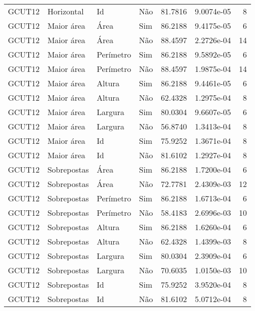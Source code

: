 \begin{tabular}{llllrrr}
GCUT12    & Horizontal  & Id        & Não         & 81.7816      & 9.0074e-05 & 8        \\
GCUT12    & Maior área  & Área      & Sim         & 86.2188      & 9.4175e-05 & 6        \\
GCUT12    & Maior área  & Área      & Não         & 88.4597      & 2.2726e-04 & 14       \\
GCUT12    & Maior área  & Perímetro & Sim         & 86.2188      & 9.5892e-05 & 6        \\
GCUT12    & Maior área  & Perímetro & Não         & 88.4597      & 1.9875e-04 & 14       \\
GCUT12    & Maior área  & Altura    & Sim         & 86.2188      & 9.4461e-05 & 6        \\
GCUT12    & Maior área  & Altura    & Não         & 62.4328      & 1.2975e-04 & 8        \\
GCUT12    & Maior área  & Largura   & Sim         & 80.0304      & 9.6607e-05 & 6        \\
GCUT12    & Maior área  & Largura   & Não         & 56.8740      & 1.3413e-04 & 8        \\
GCUT12    & Maior área  & Id        & Sim         & 75.9252      & 1.3671e-04 & 8        \\
GCUT12    & Maior área  & Id        & Não         & 81.6102      & 1.2927e-04 & 8        \\
GCUT12    & Sobrepostas & Área      & Sim         & 86.2188      & 1.7200e-04 & 6        \\
GCUT12    & Sobrepostas & Área      & Não         & 72.7781      & 2.4309e-03 & 12       \\
GCUT12    & Sobrepostas & Perímetro & Sim         & 86.2188      & 1.6713e-04 & 6        \\
GCUT12    & Sobrepostas & Perímetro & Não         & 58.4183      & 2.6996e-03 & 10       \\
GCUT12    & Sobrepostas & Altura    & Sim         & 86.2188      & 1.6260e-04 & 6        \\
GCUT12    & Sobrepostas & Altura    & Não         & 62.4328      & 1.4399e-03 & 8        \\
GCUT12    & Sobrepostas & Largura   & Sim         & 80.0304      & 2.3909e-04 & 6        \\
GCUT12    & Sobrepostas & Largura   & Não         & 70.6035      & 1.0150e-03 & 10       \\
GCUT12    & Sobrepostas & Id        & Sim         & 75.9252      & 3.9520e-04 & 8        \\
GCUT12    & Sobrepostas & Id        & Não         & 81.6102      & 5.0712e-04 & 8        \\
\hline
\end{tabular}